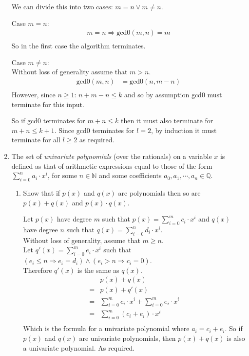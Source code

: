 \documentclass[10pt,\jkfside,a4paper]{article}
\begin{document}
\begin{enumerate}
We can divide this into two cases: $m = n \vee m \neq n$.

Case $m = n$:
\begin{equation}
\begin{split}
m = n \Longrightarrow \text{gcd0}(m, n) = m\\
\end{split}
\end{equation}
So in the first case the algorithm terminates.

Case $m \neq n$:\\
Without loss of generality assume that $m > n$.
\begin{equation}
\begin{split}
\text{gcd0}(m, n) &= \text{gcd0}(n, m - n)\\
\end{split}
\end{equation}
However, since $n \geq 1$: $n + m - n \leq k$ and so by assumption gcd0 must terminate for this input.

So if gcd0 terminates for $m + n \leq k$ then it must also terminate for $m + n \leq k + 1$.
Since gcd0 terminates for $l = 2$, by induction it must terminate for all $l \geq 2$ as required.

\item The set of \textit{univariate polynomials} (over the rationals) on a variable $x$ is defined as that 
of arithmetic expressions equal to those of the form $\sum^n_{i=0}a_i\cdot x^i$, for some $n \in \mathbb{N}$ 
and some coefficients $a_0,a_1,\cdots,a_n \in \mathbb{Q}$.

\begin{enumerate}

\item Show that if $p(x)$ and $q(x)$ are polynomials then so are $p(x) + q(x)$ and $p(x)\cdot q(x)$.

Let $p(x)$ have degree $m$ such that $p(x) = \sum^{m}_{i=0}c_i \cdot x^i$ and $q(x)$ have degree $n$ such that $q(x) = \sum^{n}_{i=0}d_i \cdot x^i$.\\
Without loss of generality, assume that $m \geq n$.\\
Let $q'(x) = \sum^{m}_{i=0}e_i\cdot x^i$ such that $(e_i \leq n \Longrightarrow e_i = d_i) \wedge (e_i > n \Longrightarrow c_i = 0)$.\\
Therefore $q'(x)$ is the same as $q(x)$.
\begin{equation}\label{linearcomb}
\begin{split}
 & p(x) + q(x)\\
=& p(x) + q'(x)\\
=& \sum^{m}_{i=0}c_i\cdot x^i + \sum^{m}_{i=0}e_i\cdot x^i\\
=& \sum^{m}_{i=0}(c_i + e_i)\cdot x^i\\
\end{split}
\end{equation}
Which is the formula for a univariate polynomial where $a_i = c_i + e_i$. So if $p(x)$ and $q(x)$ are univariate polynomials, then 
$p(x) + q(x)$ is also a univariate polynomial. As required.


\end{enumerate}
\end{enumerate}
\end{document}
